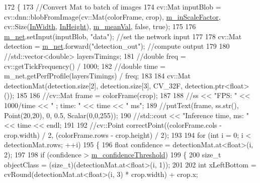 \begin{DoxyCode}
172 \{
173     \textcolor{comment}{//Convert Mat to batch of images}
174     cv::Mat inputBlob = cv::dnn::blobFromImage(cv::Mat(colorFrame, crop), 
      \mbox{\hyperlink{class_s_s_d_mobile_net_detector_a669234ba12981608ce794634abe2a361}{m\_inScaleFactor}}, cv::Size(\mbox{\hyperlink{class_s_s_d_mobile_net_detector_ac77d00e649eb5c0ddbd12229416e98c5}{InWidth}}, \mbox{\hyperlink{class_s_s_d_mobile_net_detector_afc45ce0049d048598325eda63f10056f}{InHeight}}), 
      \mbox{\hyperlink{class_s_s_d_mobile_net_detector_a5fda467ac26a8688339d31b14e7e9e20}{m\_meanVal}}, \textcolor{keyword}{false}, \textcolor{keyword}{true});
175 
176     \mbox{\hyperlink{class_s_s_d_mobile_net_detector_a49cee71e617fd5999e73fbaba9859a71}{m\_net}}.setInput(inputBlob, \textcolor{stringliteral}{"data"}); \textcolor{comment}{//set the network input}
177 
178     cv::Mat detection = \mbox{\hyperlink{class_s_s_d_mobile_net_detector_a49cee71e617fd5999e73fbaba9859a71}{m\_net}}.forward(\textcolor{stringliteral}{"detection\_out"}); \textcolor{comment}{//compute output}
179 
180     \textcolor{comment}{//std::vector<double> layersTimings;}
181     \textcolor{comment}{//double freq = cv::getTickFrequency() / 1000;}
182     \textcolor{comment}{//double time = m\_net.getPerfProfile(layersTimings) / freq;}
183 
184     cv::Mat detectionMat(detection.size[2], detection.size[3], CV\_32F, detection.ptr<\textcolor{keywordtype}{float}>());
185 
186     \textcolor{comment}{//cv::Mat frame = colorFrame(crop);}
187 
188     \textcolor{comment}{//ss << "FPS: " << 1000/time << " ; time: " << time << " ms";}
189     \textcolor{comment}{//putText(frame, ss.str(), Point(20,20), 0, 0.5, Scalar(0,0,255));}
190     \textcolor{comment}{//std::cout << "Inference time, ms: " << time << endl;}
191 
192     \textcolor{comment}{//cv::Point correctPoint((colorFrame.cols - crop.width) / 2, (colorFrame.rows - crop.height) / 2);}
193 
194     \textcolor{keywordflow}{for} (\textcolor{keywordtype}{int} i = 0; i < detectionMat.rows; ++i)
195     \{
196         \textcolor{keywordtype}{float} confidence = detectionMat.at<\textcolor{keywordtype}{float}>(i, 2);
197 
198         \textcolor{keywordflow}{if} (confidence > \mbox{\hyperlink{class_s_s_d_mobile_net_detector_ae854ddcece46a348d20debc470882b3b}{m\_confidenceThreshold}})
199         \{
200             \textcolor{keywordtype}{size\_t} objectClass = (size\_t)(detectionMat.at<\textcolor{keywordtype}{float}>(i, 1));
201 
202             \textcolor{keywordtype}{int} xLeftBottom = cvRound(detectionMat.at<\textcolor{keywordtype}{float}>(i, 3) * crop.width) + crop.x;

\end{DoxyCode}
